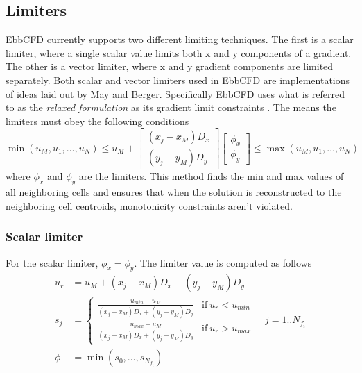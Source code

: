 \documentclass[12pt,parskip=full]{article}
\numberwithin{subsection}{section}
\begin{document}
		\subsection{Limiters}
			EbbCFD currently supports two different limiting techniques. The first is a scalar limiter, where a single scalar
			value limits both x and y components of a gradient. The other is a vector limiter, where x and y gradient components
			are limited separately. Both scalar and vector limiters used in EbbCFD are implementations of ideas laid out by
			May and Berger. Specifically EbbCFD uses what is referred to as the \textit{relaxed formulation} as its gradient 
			limit constraints \cite{doi:10.1137/120875624}. The means the limiters must obey the following conditions
			\begin{equation}
				\min{(u_M, u_1, \dots, u_N)} \le u_M + \begin{bmatrix}(x_j - x_M)D_x \\ (y_j - y_M)D_y\end{bmatrix} \begin{bmatrix} \phi_x \\ \phi_y \end{bmatrix} \le \max{(u_M, u_1, \dots, u_N)}
			\end{equation}
			where $\phi_x$ and $\phi_y$ are the limiters. This method finds the min and max values of all neighboring cells and
			ensures that when the solution is reconstructed to the neighboring cell centroids, monotonicity constraints aren't
			violated.

			\subsubsection{Scalar limiter}
				For the scalar limiter, $\phi_x = \phi_y$. The limiter value is computed as follows
				\begin{align}
					u_r &= u_M + (x_j - x_M)D_x + (y_j - y_M)D_y \\
					s_j &= \begin{cases}
						\frac{u_{min} - u_M}{(x_j - x_M)D_x + (y_j - y_M)D_y} & \mathrm{if}\ u_r < u_{min} \\
						\frac{u_{max} - u_M}{(x_j - x_M)D_x + (y_j - y_M)D_y} & \mathrm{if}\ u_r > u_{max}
					\end{cases} \quad j = 1..N_{f_i} \\
					\phi &= \min{(s_0, \dots, s_{N_{f_i}})}
				\end{align}
				
\end{document}
